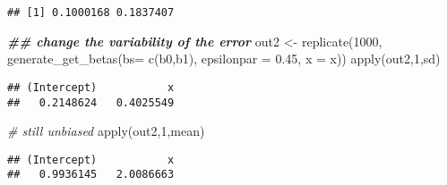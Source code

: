 \documentclass[
]{article}
\newenvironment{Shaded}{\begin{snugshade}}{\end{snugshade}}
\newcommand{\AttributeTok}[1]{\textcolor[rgb]{0.77,0.63,0.00}{#1}}
\newcommand{\CommentTok}[1]{\textcolor[rgb]{0.56,0.35,0.01}{\textit{#1}}}
\newcommand{\DecValTok}[1]{\textcolor[rgb]{0.00,0.00,0.81}{#1}}
\newcommand{\DocumentationTok}[1]{\textcolor[rgb]{0.56,0.35,0.01}{\textbf{\textit{#1}}}}
\newcommand{\FloatTok}[1]{\textcolor[rgb]{0.00,0.00,0.81}{#1}}
\newcommand{\FunctionTok}[1]{\textcolor[rgb]{0.00,0.00,0.00}{#1}}
\newcommand{\NormalTok}[1]{#1}
\newcommand{\OtherTok}[1]{\textcolor[rgb]{0.56,0.35,0.01}{#1}}
\begin{document}
\begin{verbatim}
## [1] 0.1000168 0.1837407
\end{verbatim}

\begin{Shaded}
\begin{Highlighting}[]
\DocumentationTok{\#\# change the variability of the error }
\NormalTok{out2 }\OtherTok{\textless{}{-}} \FunctionTok{replicate}\NormalTok{(}\DecValTok{1000}\NormalTok{, }\FunctionTok{generate\_get\_betas}\NormalTok{(}\AttributeTok{bs=} \FunctionTok{c}\NormalTok{(b0,b1), }\AttributeTok{epsilonpar =} \FloatTok{0.45}\NormalTok{, }\AttributeTok{x =}\NormalTok{ x))}
\FunctionTok{apply}\NormalTok{(out2,}\DecValTok{1}\NormalTok{,sd)}
\end{Highlighting}
\end{Shaded}

\begin{verbatim}
## (Intercept)           x 
##   0.2148624   0.4025549
\end{verbatim}

\begin{Shaded}
\begin{Highlighting}[]
\CommentTok{\# still unbiased }
\FunctionTok{apply}\NormalTok{(out2,}\DecValTok{1}\NormalTok{,mean)}
\end{Highlighting}
\end{Shaded}

\begin{verbatim}
## (Intercept)           x 
##   0.9936145   2.0086663
\end{verbatim}
\end{document}
